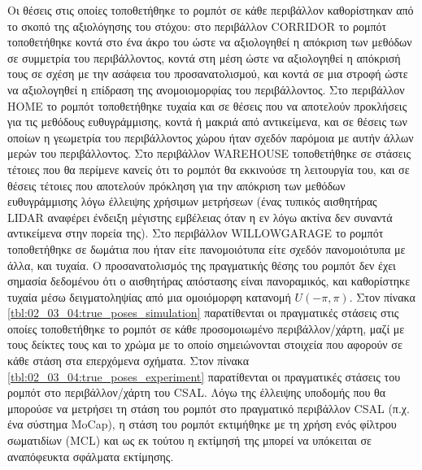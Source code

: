 Οι θέσεις στις οποίες τοποθετήθηκε το ρομπότ σε κάθε περιβάλλον καθορίστηκαν
από το σκοπό της αξιολόγησης του στόχου: στο περιβάλλον CORRIDOR το ρομπότ
τοποθετήθηκε κοντά στο ένα άκρο του ώστε να αξιολογηθεί η απόκριση των μεθόδων
σε συμμετρία του περιβάλλοντος, κοντά στη μέση ώστε να αξιολογηθεί η απόκρισή
τους σε σχέση με την ασάφεια του προσανατολισμού, και κοντά σε μια στροφή ώστε
να αξιολογηθεί η επίδραση της ανομοιομορφίας του περιβάλλοντος. Στο περιβάλλον
HOME το ρομπότ τοποθετήθηκε τυχαία και σε θέσεις που να αποτελούν προκλήσεις
για τις μεθόδους ευθυγράμμισης, κοντά ή μακριά από αντικείμενα, και σε θέσεις
των οποίων η γεωμετρία του περιβάλλοντος χώρου ήταν σχεδόν παρόμοια με αυτήν
άλλων μερών του περιβάλλοντος. Στο περιβάλλον WAREHOUSE τοποθετήθηκε σε
στάσεις τέτοιες που θα περίμενε κανείς ότι το ρομπότ θα εκκινούσε τη λειτουργία
του, και σε θέσεις τέτοιες που αποτελούν πρόκληση για την απόκριση των μεθόδων
ευθυγράμμισης λόγω έλλειψης χρήσιμων μετρήσεων (ένας τυπικός αισθητήρας LIDAR
αναφέρει ένδειξη μέγιστης εμβέλειας όταν η εν λόγω ακτίνα δεν συναντά
αντικείμενα στην πορεία της). Στο περιβάλλον WILLOWGARAGE το ρομπότ
τοποθετήθηκε σε δωμάτια που ήταν είτε πανομοιότυπα είτε σχεδόν πανομοιότυπα με
άλλα, και τυχαία. Ο προσανατολισμός της πραγματικής θέσης του ρομπότ δεν έχει
σημασία δεδομένου ότι ο αισθητήρας απόστασης είναι πανοραμικός, και καθορίστηκε
τυχαία μέσω δειγματοληψίας από μια ομοιόμορφη κατανομή $U(-\pi,\pi)$. Στον
πίνακα \ref{tbl:02_03_04:true_poses_simulation} παρατίθενται οι πραγματικές
στάσεις στις οποίες τοποθετήθηκε το ρομπότ σε κάθε προσομοιωμένο
περιβάλλον/χάρτη, μαζί με τους δείκτες τους και το χρώμα με το οποίο
σημειώνονται στοιχεία που αφορούν σε κάθε στάση στα επερχόμενα σχήματα.  Στον
πίνακα \ref{tbl:02_03_04:true_poses_experiment} παρατίθενται οι πραγματικές
στάσεις του ρομπότ στο περιβάλλον/χάρτη του CSAL. Λόγω της έλλειψης υποδομής
που θα μπορούσε να μετρήσει τη στάση του ρομπότ στο πραγματικό περιβάλλον CSAL
(π.χ.  ένα σύστημα MoCap), η στάση του ρομπότ εκτιμήθηκε με τη χρήση ενός
φίλτρου σωματιδίων (MCL) και ως εκ τούτου η εκτίμησή της μπορεί να υπόκειται σε
αναπόφευκτα σφάλματα εκτίμησης.

